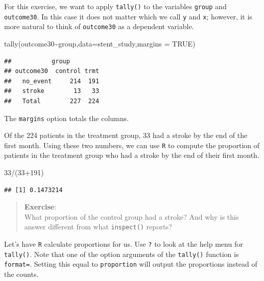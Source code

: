\documentclass[
]{book}
\newenvironment{Shaded}{\begin{snugshade}}{\end{snugshade}}
\newcommand{\AttributeTok}[1]{\textcolor[rgb]{0.77,0.63,0.00}{#1}}
\newcommand{\ConstantTok}[1]{\textcolor[rgb]{0.00,0.00,0.00}{#1}}
\newcommand{\DecValTok}[1]{\textcolor[rgb]{0.00,0.00,0.81}{#1}}
\newcommand{\FunctionTok}[1]{\textcolor[rgb]{0.00,0.00,0.00}{#1}}
\newcommand{\NormalTok}[1]{#1}
\newcommand{\SpecialCharTok}[1]{\textcolor[rgb]{0.00,0.00,0.00}{#1}}
\begin{document}
For this exercise, we want to apply \texttt{tally()} to the variables \texttt{group} and \texttt{outcome30}. In this case it does not matter which we call \texttt{y} and \texttt{x}; however, it is more natural to think of \texttt{outcome30} as a dependent variable.

\begin{Shaded}
\begin{Highlighting}[]
\FunctionTok{tally}\NormalTok{(outcome30}\SpecialCharTok{\textasciitilde{}}\NormalTok{group,}\AttributeTok{data=}\NormalTok{stent\_study,}\AttributeTok{margins =} \ConstantTok{TRUE}\NormalTok{)}
\end{Highlighting}
\end{Shaded}

\begin{verbatim}
##           group
## outcome30  control trmt
##   no_event     214  191
##   stroke        13   33
##   Total        227  224
\end{verbatim}

The \texttt{margins} option totals the columns.

Of the 224 patients in the treatment group, 33 had a stroke by the end of the first month. Using these two numbers, we can use \texttt{R} to compute the proportion of patients in the treatment group who had a stroke by the end of their first month.

\begin{Shaded}
\begin{Highlighting}[]
\DecValTok{33}\SpecialCharTok{/}\NormalTok{(}\DecValTok{33}\SpecialCharTok{+}\DecValTok{191}\NormalTok{)}
\end{Highlighting}
\end{Shaded}

\begin{verbatim}
## [1] 0.1473214
\end{verbatim}

\begin{quote}
\textbf{Exercise}:\\
What proportion of the control group had a stroke? And why is this answer different from what \texttt{inspect()} reports?
\end{quote}

Let's have \texttt{R} calculate proportions for us. Use \texttt{?} to look at the help menu for \texttt{tally()}. Note that one of the option arguments of the \texttt{tally()} function is \texttt{format=}. Setting this equal to \texttt{proportion} will output the proportions instead of the counts.
\end{document}
